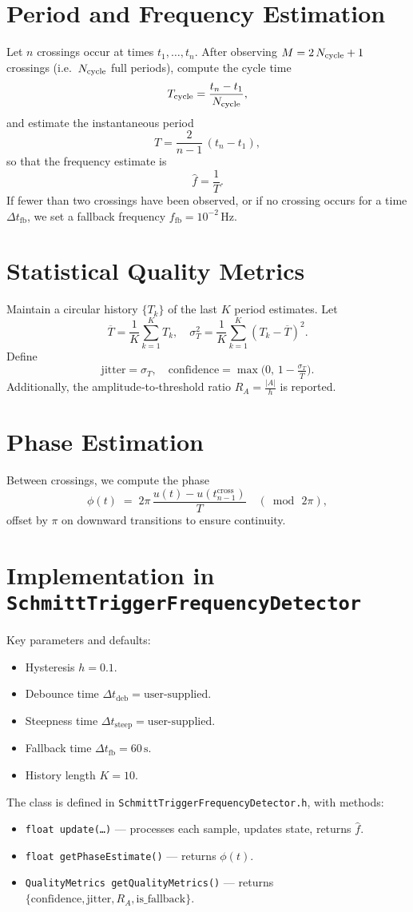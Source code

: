 \documentclass[12pt,letterpaper]{article}
\begin{document}
\section{Period and Frequency Estimation}
Let \(n\) crossings occur at times \(t_1,\dots,t_n\).  After observing \(M=2\,N_{\rm cycle}+1\) crossings (i.e.\ \(N_{\rm cycle}\) full periods), compute the cycle time
\[
T_{\rm cycle}
= \frac{t_{n} - t_{1}}{\,N_{\rm cycle}\,},
\]
and estimate the instantaneous period
\[
T = \frac{2}{n-1}\,(t_{n} - t_{1}),
\]
so that the frequency estimate is
\[
\hat f = \frac{1}{T}.
\]
If fewer than two crossings have been observed, or if no crossing occurs for a time
\(\Delta t_{\mathrm{fb}}\), we set a fallback frequency
\(\displaystyle f_{\mathrm{fb}} = 10^{-2}\,\mathrm{Hz}.\)

\section{Statistical Quality Metrics}
Maintain a circular history \(\{T_k\}\) of the last \(K\) period estimates.  Let
\[
\overline{T} = \frac1K\sum_{k=1}^K T_k,
\quad
\sigma_T^2 = \frac1K\sum_{k=1}^K (T_k-\overline{T})^2.
\]
Define
\[
\text{jitter} = \sigma_T,
\quad
\text{confidence} = \max\bigl(0,\,1 - \tfrac{\sigma_T}{\overline{T}}\bigr).
\]
Additionally, the amplitude‐to‐threshold ratio
\(\displaystyle R_A = \frac{|A|}{h}\) is reported.

\section{Phase Estimation}
Between crossings, we compute the phase
\[
\phi(t) \;=\; 2\pi\,\frac{u(t) - u(t_{n-1}^{\mathrm{cross}})}{T}
\quad (\bmod\,2\pi),
\]
offset by \(\pi\) on downward transitions to ensure continuity.

\section{Implementation in \texttt{SchmittTriggerFrequencyDetector}}
Key parameters and defaults:
\begin{itemize}
  \item Hysteresis \(h=0.1\).
  \item Debounce time \(\Delta t_{\mathrm{deb}}= \text{user‐supplied}\).
  \item Steepness time \(\Delta t_{\mathrm{steep}}= \text{user‐supplied}\).
  \item Fallback time \(\Delta t_{\mathrm{fb}}=60\,\mathrm{s}\).
  \item History length \(K=10\).
\end{itemize}
The class is defined in \texttt{SchmittTriggerFrequencyDetector.h}, with methods:
\begin{itemize}
  \item \texttt{float update(…)} — processes each sample, updates state, returns \(\hat f\).
  \item \texttt{float getPhaseEstimate()} — returns \(\phi(t)\).
  \item \texttt{QualityMetrics getQualityMetrics()} — returns \(\{\mathrm{confidence},\mathrm{jitter},R_A,\mathrm{is\_fallback}\}\).
\end{itemize}
\end{document}
